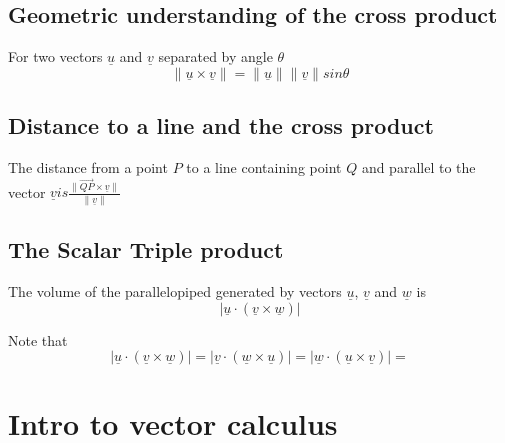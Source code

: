 \subsection{Geometric understanding of the cross product}
\begin{framed}
  For two vectors $ \underline{u}$ and $ \underline{v}$ separated by angle $\theta$ 
  \[
    \lVert \underline{u} \times \underline{v} \rVert = \lVert \underline{u} \rVert \lVert \underline{v} \rVert sin \theta
  \] 
\end{framed}

\subsection{Distance to a line and the cross product}
\begin{framed}
   The distance from a point $P$ to a line containing point $Q$ and parallel to the vector $ \underline{v} is
   \frac{ \lVert \vec{QP} \times \underline{v} \rVert }{ \lVert \underline{v} \rVert }$
\end{framed}

\subsection{The Scalar Triple product}
\begin{framed}
The volume of the parallelopiped generated by vectors $ \underline{u}$, $ \underline{v}$ and $ \underline{w}$ is
\[
  \lvert \underline{u} \cdot \left( \underline{v} \times \underline{w} \right) \rvert
\] 

Note that 
\[
  \lvert \underline{u} \cdot \left( \underline{v} \times \underline{w} \right) \rvert =
  \lvert \underline{v} \cdot \left( \underline{w} \times \underline{u} \right) \rvert =
  \lvert \underline{w} \cdot \left( \underline{u} \times \underline{v} \right) \rvert =
\]
\end{framed}


\section{Intro to vector calculus}

